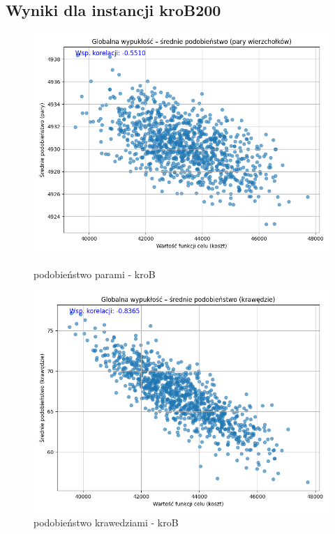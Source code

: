 \documentclass[11pt]{article}
\begin{document}
\subsection{Wyniki dla instancji kroB200}\label{subsec:wyniki-dla-instancji-krob200}

\begin{figure}[H]
    \begin{minipage}[t]{0.45\textwidth}
        \centering
        \includegraphics[width=\linewidth]{wypuklosci/podobienstwo-parami-kroB}
        \caption{podobieństwo parami - kroB}
    \end{minipage}
    \hfill
    \begin{minipage}[t]{0.45\textwidth}
        \centering
        \includegraphics[width=\linewidth]{wypuklosci/podobienstwo-krawedziami-kroB}
        \caption{podobieństwo krawedziami - kroB}
    \end{minipage}\label{fig:figure13}
\end{figure}
\end{document}
